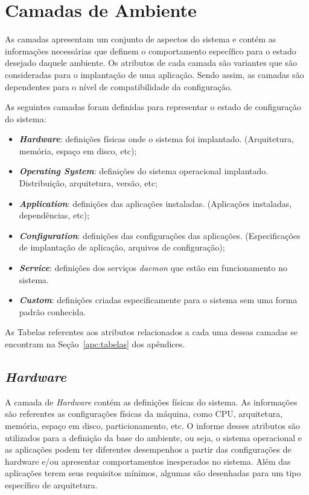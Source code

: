 \section{Camadas de Ambiente}
\label{sec:cam-amb}

As camadas apresentam um conjunto de aspectos do sistema e contém as
informações necessárias que definem o comportamento específico para o
estado desejado daquele ambiente. Os atributos de cada camada são variantes
que são consideradas para o implantação de uma aplicação. Sendo assim, as
camadas são dependentes para o nível de compatibilidade da configuração.

As seguintes camadas foram definidas para representar o estado de configuração do
sistema:
\begin{itemize}
  \item \textit{\textbf{Hardware}}: definições físicas onde o sistema foi implantado.
    (Arquitetura, memória, espaço em disco, etc);
  \item \textit{\textbf{Operating System}}: definições do sistema operacional
    implantado. Distribuição, arquitetura, versão, etc;
  \item \textit{\textbf{Application}}: definições das aplicações instaladas.
    (Aplicações instaladas, dependências, etc);
  \item \textit{\textbf{Configuration}}: definições das configurações das
    aplicações. (Especificações de implantação de aplicação, arquivos
    de configuração);
\item \textit{\textbf{Service}}: definições dos serviços \textit{daemon} que estão em
    funcionamento no sistema.
  \item \textit{\textbf{Custom}}: definições criadas especificamente para o
    sistema sem uma forma padrão conhecida.
\end{itemize}

As Tabelas referentes aos atributos relacionados a cada uma dessas camadas se
encontram na Seção~\ref{apc:tabelas} dos apêndices.

\subsection{\textit{Hardware}}
\label{sec:cam-hard}

A camada de \textit{Hardware} contém as definições físicas do sistema.
As informações são referentes as configurações físicas da máquina, como
CPU, arquitetura, memória, espaço em disco, particionamento, etc. O informe desses atributos
são utilizados para a definição da base do ambiente, ou seja, o sistema
operacional e as aplicações podem ter diferentes desempenhos a partir das
configurações de hardware e/ou apresentar comportamentos inesperados no sistema.
Além das aplicações terem seus requisitos mínimos, algumas são desenhadas
para um tipo específico de arquitetura.

